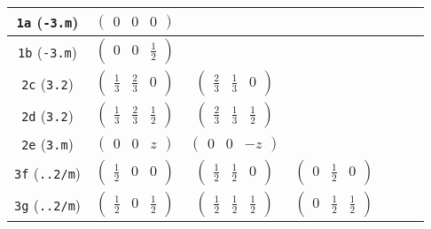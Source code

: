 \documentclass[fleqn,9pt,landscape]{jsarticle}
\begin{document}
\begin{center}
\begin{longtable}{ccccccc}
{\tt 1a} ({\tt -3.m}) & $ \begin{pmatrix} 0 & 0 & 0 \end{pmatrix} $ & $  $ & $  $ & $  $ & $  $ & $  $ \\ \hline
{\tt 1b} ({\tt -3.m}) & $ \begin{pmatrix} 0 & 0 & \frac{1}{2} \end{pmatrix} $ & $  $ & $  $ & $  $ & $  $ & $  $ \\ \hline
{\tt 2c} ({\tt 3.2}) & $ \begin{pmatrix} \frac{1}{3} & \frac{2}{3} & 0 \end{pmatrix} $ & $ \begin{pmatrix} \frac{2}{3} & \frac{1}{3} & 0 \end{pmatrix} $ & $  $ & $  $ & $  $ & $  $ \\ \hline
{\tt 2d} ({\tt 3.2}) & $ \begin{pmatrix} \frac{1}{3} & \frac{2}{3} & \frac{1}{2} \end{pmatrix} $ & $ \begin{pmatrix} \frac{2}{3} & \frac{1}{3} & \frac{1}{2} \end{pmatrix} $ & $  $ & $  $ & $  $ & $  $ \\ \hline
{\tt 2e} ({\tt 3.m}) & $ \begin{pmatrix} 0 & 0 & z \end{pmatrix} $ & $ \begin{pmatrix} 0 & 0 & - z \end{pmatrix} $ & $  $ & $  $ & $  $ & $  $ \\ \hline
{\tt 3f} ({\tt ..2/m}) & $ \begin{pmatrix} \frac{1}{2} & 0 & 0 \end{pmatrix} $ & $ \begin{pmatrix} \frac{1}{2} & \frac{1}{2} & 0 \end{pmatrix} $ & $ \begin{pmatrix} 0 & \frac{1}{2} & 0 \end{pmatrix} $ & $  $ & $  $ & $  $ \\ \hline
{\tt 3g} ({\tt ..2/m}) & $ \begin{pmatrix} \frac{1}{2} & 0 & \frac{1}{2} \end{pmatrix} $ & $ \begin{pmatrix} \frac{1}{2} & \frac{1}{2} & \frac{1}{2} \end{pmatrix} $ & $ \begin{pmatrix} 0 & \frac{1}{2} & \frac{1}{2} \end{pmatrix} $ & $  $ & $  $ & $  $ \\ \hline

\end{longtable}
\end{center}
\end{document}
